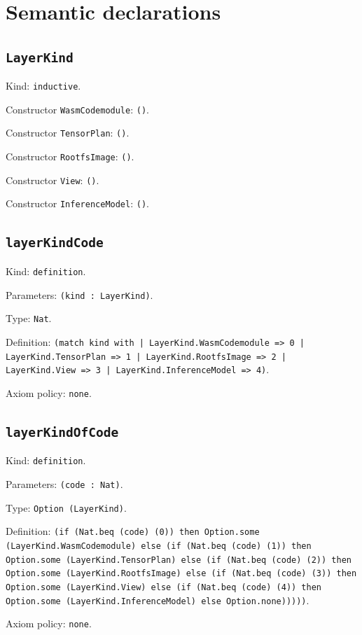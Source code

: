 \documentclass[11pt]{article}
\begin{document}
\section*{Semantic declarations}
\subsection*{\texttt{LayerKind}}
\noindent Kind: \texttt{inductive}.\par
\noindent Constructor \texttt{WasmCodemodule}: \texttt{()}.\par
\noindent Constructor \texttt{TensorPlan}: \texttt{()}.\par
\noindent Constructor \texttt{RootfsImage}: \texttt{()}.\par
\noindent Constructor \texttt{View}: \texttt{()}.\par
\noindent Constructor \texttt{InferenceModel}: \texttt{()}.\par
\subsection*{\texttt{layerKindCode}}
\noindent Kind: \texttt{definition}.\par
\noindent Parameters: \texttt{(kind : LayerKind)}.\par
\noindent Type: \texttt{Nat}.\par
\noindent Definition: \texttt{(match kind with | LayerKind.WasmCodemodule => 0 | LayerKind.TensorPlan => 1 | LayerKind.RootfsImage => 2 | LayerKind.View => 3 | LayerKind.InferenceModel => 4)}.\par
\noindent Axiom policy: \texttt{none}.\par
\subsection*{\texttt{layerKindOfCode}}
\noindent Kind: \texttt{definition}.\par
\noindent Parameters: \texttt{(code : Nat)}.\par
\noindent Type: \texttt{Option (LayerKind)}.\par
\noindent Definition: \texttt{(if (Nat.beq (code) (0)) then Option.some (LayerKind.WasmCodemodule) else (if (Nat.beq (code) (1)) then Option.some (LayerKind.TensorPlan) else (if (Nat.beq (code) (2)) then Option.some (LayerKind.RootfsImage) else (if (Nat.beq (code) (3)) then Option.some (LayerKind.View) else (if (Nat.beq (code) (4)) then Option.some (LayerKind.InferenceModel) else Option.none)))))}.\par
\noindent Axiom policy: \texttt{none}.\par
\end{document}
